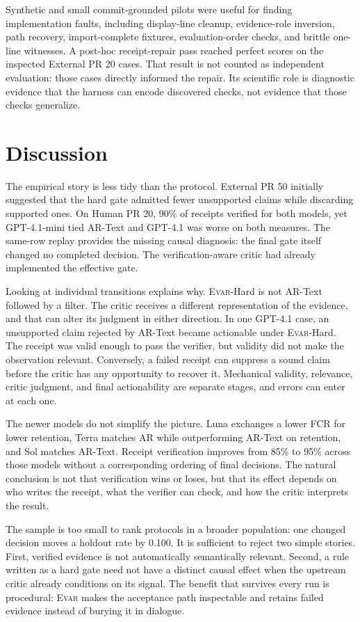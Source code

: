 \documentclass[acmsmall,screen,review,anonymous]{acmart}
\newcommand{\evar}{\textsc{Evar}\xspace}
\begin{document}
Synthetic and small commit-grounded pilots were useful for finding implementation faults, including display-line cleanup, evidence-role inversion, path recovery, import-complete fixtures, evaluation-order checks, and brittle one-line witnesses. A post-hoc receipt-repair pass reached perfect scores on the inspected External PR 20 cases. That result is not counted as independent evaluation: those cases directly informed the repair. Its scientific role is diagnostic evidence that the harness can encode discovered checks, not evidence that those checks generalize.

\section{Discussion}

The empirical story is less tidy than the protocol. External PR 50 initially suggested that the hard gate admitted fewer unsupported claims while discarding supported ones. On Human PR 20, 90\% of receipts verified for both models, yet GPT-4.1-mini tied AR-Text and GPT-4.1 was worse on both measures. The same-row replay provides the missing causal diagnosis: the final gate itself changed no completed decision. The verification-aware critic had already implemented the effective gate.

Looking at individual transitions explains why. \evar-Hard is not AR-Text followed by a filter. The critic receives a different representation of the evidence, and that can alter its judgment in either direction. In one GPT-4.1 case, an unsupported claim rejected by AR-Text became actionable under \evar-Hard. The receipt was valid enough to pass the verifier, but validity did not make the observation relevant. Conversely, a failed receipt can suppress a sound claim before the critic has any opportunity to recover it. Mechanical validity, relevance, critic judgment, and final actionability are separate stages, and errors can enter at each one.

The newer models do not simplify the picture. Luna exchanges a lower FCR for lower retention, Terra matches AR while outperforming AR-Text on retention, and Sol matches AR-Text. Receipt verification improves from 85\% to 95\% across those models without a corresponding ordering of final decisions. The natural conclusion is not that verification wins or loses, but that its effect depends on who writes the receipt, what the verifier can check, and how the critic interprets the result.

The sample is too small to rank protocols in a broader population: one changed decision moves a holdout rate by 0.100. It is sufficient to reject two simple stories. First, verified evidence is not automatically semantically relevant. Second, a rule written as a hard gate need not have a distinct causal effect when the upstream critic already conditions on its signal. The benefit that survives every run is procedural: \evar makes the acceptance path inspectable and retains failed evidence instead of burying it in dialogue.
\end{document}
